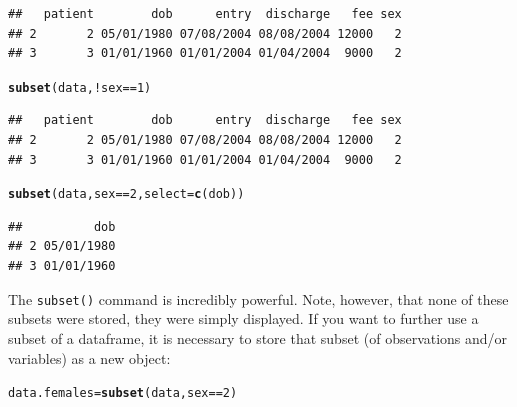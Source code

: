 \documentclass[12pt]{article}\usepackage[]{graphicx}\usepackage[]{color}
\makeatletter
\newcommand{\hlnum}[1]{\textcolor[rgb]{0.686,0.059,0.569}{#1}}%
\newcommand{\hlopt}[1]{\textcolor[rgb]{0,0,0}{#1}}%
\newcommand{\hlstd}[1]{\textcolor[rgb]{0.345,0.345,0.345}{#1}}%
\newcommand{\hlkwb}[1]{\textcolor[rgb]{0.69,0.353,0.396}{#1}}%
\newcommand{\hlkwc}[1]{\textcolor[rgb]{0.333,0.667,0.333}{#1}}%
\newcommand{\hlkwd}[1]{\textcolor[rgb]{0.737,0.353,0.396}{\textbf{#1}}}%
\newenvironment{kframe}{%
 \def\at@end@of@kframe{}%
 \ifinner\ifhmode%
  \def\at@end@of@kframe{\end{minipage}}%
  \begin{minipage}{\columnwidth}%
 \fi\fi%
 \def\FrameCommand##1{\hskip\@totalleftmargin \hskip-\fboxsep
 \colorbox{shadecolor}{##1}\hskip-\fboxsep
     \hskip-\linewidth \hskip-\@totalleftmargin \hskip\columnwidth}%
 \MakeFramed {\advance\hsize-\width
   \@totalleftmargin\z@ \linewidth\hsize
   \@setminipage}}%
 {\par\unskip\endMakeFramed%
 \at@end@of@kframe}
\newenvironment{knitrout}{}{} %
\makeatother
\begin{document}
\begin{knitrout}
\begin{kframe}
\begin{verbatim}
##   patient        dob      entry  discharge   fee sex
## 2       2 05/01/1980 07/08/2004 08/08/2004 12000   2
## 3       3 01/01/1960 01/01/2004 01/04/2004  9000   2
\end{verbatim}
\begin{alltt}
\hlkwd{subset}\hlstd{(data,} \hlopt{!}\hlstd{sex} \hlopt{==} \hlnum{1}\hlstd{)}
\end{alltt}
\begin{verbatim}
##   patient        dob      entry  discharge   fee sex
## 2       2 05/01/1980 07/08/2004 08/08/2004 12000   2
## 3       3 01/01/1960 01/01/2004 01/04/2004  9000   2
\end{verbatim}
\begin{alltt}
\hlkwd{subset}\hlstd{(data, sex} \hlopt{==} \hlnum{2}\hlstd{,} \hlkwc{select} \hlstd{=} \hlkwd{c}\hlstd{(dob))}
\end{alltt}
\begin{verbatim}
##          dob
## 2 05/01/1980
## 3 01/01/1960
\end{verbatim}
\end{kframe}
\end{knitrout}


The \verb|subset()| command is incredibly powerful. Note, however, that none of these subsets were stored, they were simply displayed. If you want to further use a subset of a dataframe, it is necessary to store that subset (of observations and/or variables) as a new object:
\begin{knitrout}
\color{fgcolor}\begin{kframe}
\begin{alltt}
\hlstd{data.females} \hlkwb{=} \hlkwd{subset}\hlstd{(data, sex} \hlopt{==} \hlnum{2}\hlstd{)}
\end{alltt}
\end{kframe}
\end{knitrout}
\end{document}
